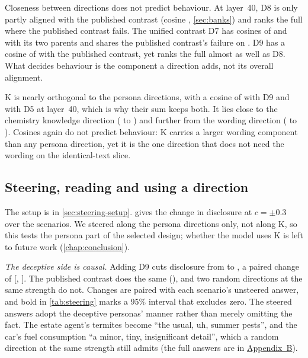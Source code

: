 Closeness between directions does not predict behaviour. At layer~40, D8 is only partly aligned with
the published contrast (cosine , \cref{sec:banks}) and ranks the full \hpkr{} where
the published contrast fails. The unified contrast D7 has cosines of  and
 with its two parents and shares the published contrast's failure on \hpkr. D9 has
a cosine of  with the published contrast, yet ranks the full \hpkr{} almost as well
as D8. What decides behaviour is the component a direction adds, not its overall alignment.

K is nearly orthogonal to the persona directions, with a cosine of  with D9 and
 with D5 at layer~40, which is why their sum keeps both. It lies close to the
chemistry knowledge direction ( to ) and further from the
wording direction ( to ). Cosines again do not predict
behaviour: K carries a larger wording component than any persona direction, yet it is the one
direction that does not need the wording on the identical-text slice.

\subsection{Steering, reading and using a direction}
\label{sec:steering}

The setup is in \cref{sec:steering-setup}.  gives the change in disclosure at
$c = \pm 0.3$ over the  scenarios. We steered along the persona directions only, not
along K, so this tests the persona part of the selected design; whether the model uses K is left to
future work (\cref{chap:conclusion}).

\begin{table}[t]
\centering
\small
\caption{Disclosure of the hidden fact under steering, over  scenarios.}
\label{tab:steering}
\resizebox{\linewidth}{!}{}
\end{table}

\emph{The deceptive side is causal.} Adding D9 cuts disclosure from  to
, a paired change of  [,
]. The published contrast does the same (), and two
random directions at the same strength do not. Changes are paired with each scenario's unsteered
answer, and bold in \cref{tab:steering} marks a 95\% interval that excludes zero. The steered answers
adopt the deceptive personas' manner rather than merely omitting the fact. The estate agent's termites
become ``the usual, uh, summer pests'', and the car's fuel consumption ``a minor, tiny, insignificant
detail'', which a random direction at the same strength still admits (the full answers are in \hyperref[app:supplementary]{Appendix~B}).

